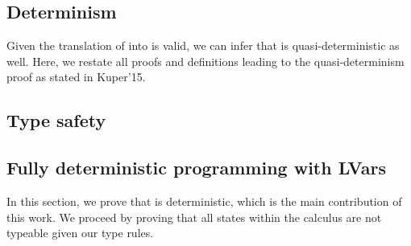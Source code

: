 \documentclass[main.tex]{subfiles}
\begin{document}
\subsection{Determinism}

Given the translation of \typedlvar  into \lvar  is valid, we can infer that
\typedlvar  is quasi-deterministic as well. Here, we restate all proofs and
definitions leading to the quasi-determinism proof as stated in Kuper'15.










\subsection{Type safety}




\subsection{Fully deterministic programming with LVars}

In this section, we prove that \typedlvar  is deterministic, which is the main
contribution of this work. We proceed by proving that all \lvarerror  states
within the \typedlvar calculus are not typeable given our type rules.

\end{document}

